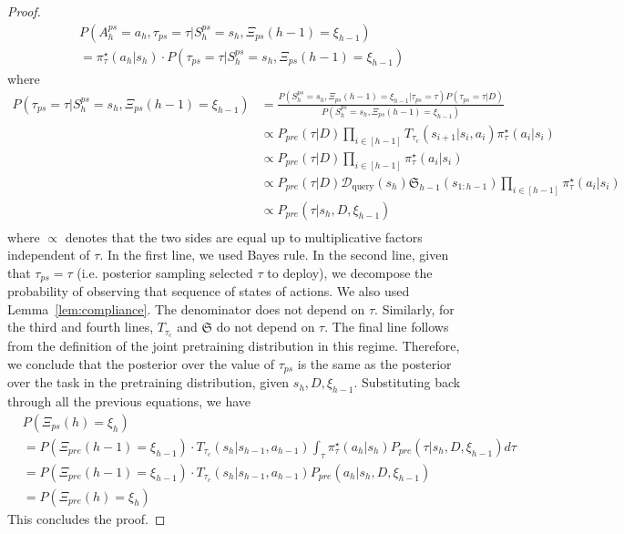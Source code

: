 \documentclass{article}
\newcommand{\Dcal}{\mathcal{D}}
\newcommand{\Sfrak}{{\mathfrak{S}}}
\newcommand{\Dquery}{\Dcal_{\text{query}}}
\newcommand{\pistar}{\pi^{\star}}
\begin{document}
\begin{proof}
\begin{align}
    & P(A_h^{ps} = a_h, \tau_{ps} = \tau | S^{ps}_h = s_h, \Xi_{ps}(h - 1) = \xi_{h - 1}) \\
    & = \pistar_{\tau}(a_h | s_h) \cdot P(\tau_{ps} = \tau  |  S^{ps}_h = s_h,  \Xi_{ps}(h - 1) = \xi_{h - 1})
\end{align}
where
\begin{align}
    P(\tau_{ps} = \tau  |  S^{ps}_h = s_h,  \Xi_{ps}(h - 1) = \xi_{h - 1})
    & = \frac{P(S^{ps}_h = s_h, \Xi_{ps}(h - 1) = \xi_{h - 1 }  | \tau_{ps} = \tau ) P(\tau_{ps} = \tau | D) } {P(S^{ps}_h = s_h, \Xi_{ps}(h - 1) = \xi_{h - 1 } )} \\
    & \propto P_{pre}(\tau | D)\prod_{i \in [h - 1]} T_{\tau_c} ( s_{i + 1} | s_i, a_i)  \pistar_{\tau}(a_i | s_i) \\
    & \propto P_{pre}(\tau | D)\prod_{i \in [h - 1]} \pistar_{\tau}(a_i | s_i) \\
    & \propto P_{pre}(\tau | D) \Dquery(s_h) \Sfrak_{h - 1} (s_{1:h - 1}) \prod_{i \in [h - 1]}  \pistar_{\tau}(a_i | s_i) \\
    & \propto P_{pre}(\tau | s_h, D, \xi_{h - 1})  \\
\end{align}
where $\propto$ denotes that the two sides are equal up to multiplicative factors independent of $\tau$.  In the first line, we used Bayes rule. In the second line, given that $\tau_{ps} = \tau$ (i.e. posterior sampling selected $\tau$ to deploy),  we decompose the probability of observing that sequence of states of actions. We also used Lemma~\ref{lem:compliance}. The denominator does not depend on $\tau$. Similarly, for the third and fourth lines, $T_{\tau_c}$ and $\Sfrak$ do not depend on $\tau$. The final line follows from the definition of the joint pretraining distribution in this regime.
Therefore, we conclude that the posterior over the value of $\tau_{ps}$ is the same as the posterior over the task in the pretraining distribution, given $s_h, D, \xi_{h - 1}$. Substituting back through all the previous equations, we have
\begin{align}
    & P(\Xi_{ps}(h) = \xi_h) \\
    & = P(\Xi_{pre}(h - 1) = \xi_{h - 1} ) \cdot T_{\tau_c}(s_h | s_{h - 1}, a_{h - 1})\int_{\tau} \pistar_\tau(a_h| s_h) P_{pre}(\tau | s_h, D, \xi_{h - 1}) d \tau \\
    & = P(\Xi_{pre}(h - 1) = \xi_{h - 1} ) \cdot T_{\tau_c}(s_h | s_{h - 1}, a_{h - 1}) P_{pre}(a_h | s_h, D, \xi_{h - 1}) \\
    & = P(\Xi_{pre}(h) = \xi_h)
\end{align}
This concludes the proof.
\end{proof}
\end{document}
